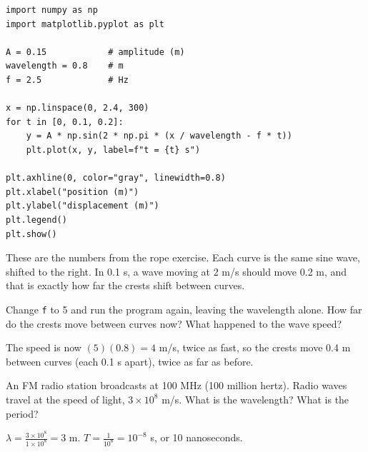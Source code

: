 \begin{verbatim}
import numpy as np
import matplotlib.pyplot as plt

A = 0.15            # amplitude (m)
wavelength = 0.8    # m
f = 2.5             # Hz

x = np.linspace(0, 2.4, 300)
for t in [0, 0.1, 0.2]:
    y = A * np.sin(2 * np.pi * (x / wavelength - f * t))
    plt.plot(x, y, label=f"t = {t} s")

plt.axhline(0, color="gray", linewidth=0.8)
plt.xlabel("position (m)")
plt.ylabel("displacement (m)")
plt.legend()
plt.show()
\end{verbatim}

These are the numbers from the rope exercise. Each curve is the same sine
wave, shifted to the right. In 0.1 s, a wave moving at 2 m/s should move
0.2 m, and that is exactly how far the crests shift between curves.

\begin{Exercise}[title={Faster waves}, label=wave_python]
Change \texttt{f} to 5 and run the program again, leaving the
wavelength alone. How far do the crests move between curves now? What
happened to the wave speed?
\end{Exercise}
\begin{Answer}[ref=wave_python]
The speed is now $(5)(0.8) = 4$ m/s, twice as fast, so the crests move
0.4 m between curves (each 0.1 s apart), twice as far as before.
\end{Answer}

\begin{Exercise}[title={Radio waves}, label=wave_radio]
An FM radio station broadcasts at 100 MHz (100 million hertz). Radio waves
travel at the speed of light, $3 \times 10^8$ m/s. What is the wavelength?
What is the period?
\end{Exercise}
\begin{Answer}[ref=wave_radio]
$\lambda = \frac{3 \times 10^8}{1 \times 10^8} = 3$ m.
$T = \frac{1}{10^8} = 10^{-8}$ s, or 10 nanoseconds.
\end{Answer}
